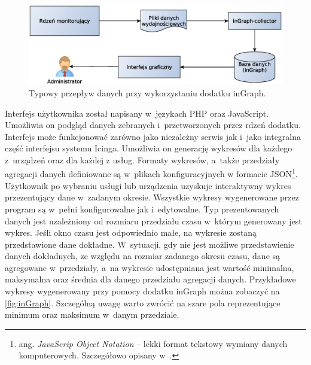 \begin{figure}[ht]
  \caption{Typowy przepływ danych przy wykorzystaniu dodatku inGraph.}
  \label{fig:inGraphFlow}
\includegraphics[width=1\textwidth]{img/ingraphFlow}
\end{figure}

Interfejs użytkownika został napisany w~językach PHP oraz
JavaScript. Umożliwia on podgląd danych zebranych i~przetworzonych
przez rdzeń dodatku. Interfejs może funkcjonować zarówno jako
niezależny serwis jak i~jako integralna część interfejsu systemu
Icinga. Umożliwia on generację wykresów dla każdego z~urządzeń oraz
dla każdej z usług. Formaty wykresów, a~także przedziały agregacji
danych definiowane są w~plikach konfiguracyjnych w formacie
JSON\footnote{ang. {\em JavaScrip Object Notation} -- lekki format
  tekstowy wymiany danych komputerowych. Szczegółowo opisany w~\cite{www:JSON}.}.
Użytkownik po wybraniu usługi lub urządzenia uzyskuje interaktywny
wykres przezentujący dane w~zadanym okresie. Wszystkie wykresy
wygenerowane przez program są w~pełni konfigurowalne jak
i~edytowalne. Typ prezentowanych danych jest uzależniony od rozmiaru
przedziału czasu w~którym generowany jest wykres. Jeśli okno czasu
jest odpowiednio małe, na wykresie zostaną przedstawione dane
dokładne. W~sytuacji, gdy nie jest możliwe przedstawienie danych
dokładnych, ze względu na rozmiar zadanego okresu czasu, dane są
agregowane w~przedziały, a~na wykresie udostępniana jest wartość
minimalna, maksymalna oraz średnia dla danego przedziału agregacji
danych. Przykładowe wykresy wygenerowany przy pomocy dodatku inGraph
można zobaczyć na \ref{fig:inGraph}. Szczególną uwagę warto zwrócić na
szare pola reprezentujące minimum oraz maksimum w~danym przedziale.

